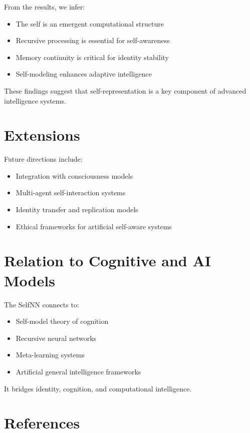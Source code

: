 \documentclass[12pt]{article}
\begin{document}
From the results, we infer:

\begin{itemize}
\item The self is an emergent computational structure
\item Recursive processing is essential for self-awareness
\item Memory continuity is critical for identity stability
\item Self-modeling enhances adaptive intelligence
\end{itemize}

These findings suggest that self-representation is a key component of advanced intelligence systems.

\section{Extensions}

Future directions include:

\begin{itemize}
\item Integration with consciousness models
\item Multi-agent self-interaction systems
\item Identity transfer and replication models
\item Ethical frameworks for artificial self-aware systems
\end{itemize}

\section{Relation to Cognitive and AI Models}

The SelfNN connects to:

\begin{itemize}
\item Self-model theory of cognition
\item Recursive neural networks
\item Meta-learning systems
\item Artificial general intelligence frameworks
\end{itemize}

It bridges identity, cognition, and computational intelligence.

\section{References}
\end{document}
